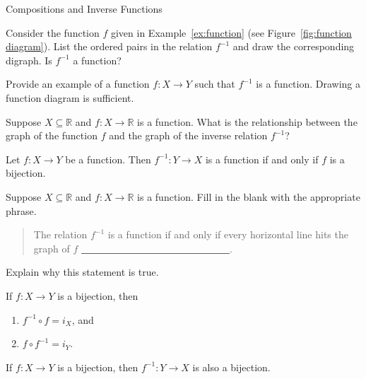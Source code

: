\begin{section}{Compositions and Inverse Functions}
\begin{problem}
Consider the function $f$ given in Example~\ref{ex:function} (see Figure~\ref{fig:function diagram}). List the ordered pairs in the relation $f^{-1}$ and draw the corresponding digraph. Is $f^{-1}$ a function?
\end{problem}


\begin{problem}
Provide an example of a function $f:X\to Y$ such that $f^{-1}$ is a function. Drawing a function diagram is sufficient.
\end{problem}

\begin{problem}
Suppose $X\subseteq \mathbb{R}$ and $f:X\to \mathbb{R}$ is a function. What is the relationship between the graph of the function $f$ and the graph of the inverse relation $f^{-1}$?
\end{problem}

\begin{theorem}
Let $f:X\to Y$ be a function.  Then $f^{-1}:Y\to X$ is a function if and only if $f$ is a bijection.
\end{theorem}

\begin{problem}
Suppose $X\subseteq \mathbb{R}$ and $f:X\to \mathbb{R}$ is a function. Fill in the blank with the appropriate phrase.
\begin{quote}
The relation $f^{-1}$ is a function if and only if every horizontal line hits the graph of $f$ \underline{\ \ \ \ \ \ \ \  \ \ \ \ \ \ \ \ \ \ \ \ \ \ \ \ \ \ \ \ \ \ }.%
\end{quote}
Explain why this statement is true.
\end{problem}

\begin{theorem}\label{thm:comp of inverses}
If $f:X\to Y$ is a bijection, then
\begin{enumerate}[label=\textrm{(\alph*)}]
\item $f^{-1}\circ f=i_X$, and
\item $f\circ f^{-1}=i_Y$.
\end{enumerate}
\end{theorem}

\begin{theorem}
If $f:X\to Y$ is a bijection, then $f^{-1}:Y\to X$ is also a bijection.
\end{theorem}


\end{section}
